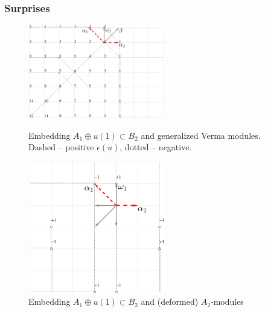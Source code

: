 \documentclass[pdftex]{beamer}
\theoremstyle{definition} \newtheorem{Def}{Definition}
\begin{document}
\begin{frame}
  \frametitle{Surprises}
  \begin{figure}[t]
    \vspace*{-0.5cm}
    \begin{multicols}{2}
      \hfill
        \includegraphics[width=60mm]{figures/B2_Gen_Verma_Decomp}
      \hfill
      \caption{Embedding $A_{1}\oplus u(1) \subset B_{2}$ and generalized Verma modules.
        Dashed -- positive $\epsilon(u)$, dotted --  negative.}
      \hfill
      \includegraphics[width=60mm]{figures/B2_A1_A2}
      \caption{Embedding $A_{1}\oplus u(1) \subset B_{2}$ and (deformed) $A_{2}$-modules}
    \end{multicols}
  \end{figure}
\end{frame}
\end{document}
